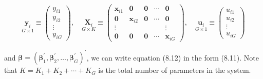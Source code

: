 \documentclass[10pt]{article}
\begin{document}
\[
\underset{G \times 1}{\mathbf{y}_{i}} \equiv\left(\begin{array}{c}
y_{i 1}  \tag{8.14}\\
y_{i 2} \\
\vdots \\
y_{i G}
\end{array}\right), \quad \underset{G \times K}{\mathbf{X}_{i}} \equiv\left(\begin{array}{ccccc}
\mathbf{x}_{i 1} & \mathbf{0} & \mathbf{0} & \cdots & \mathbf{0} \\
\mathbf{0} & \mathbf{x}_{i 2} & \mathbf{0} & \cdots & \mathbf{0} \\
\vdots & & & & \vdots \\
\mathbf{0} & \mathbf{0} & \mathbf{0} & \cdots & \mathbf{x}_{i G}
\end{array}\right), \quad \underset{G \times 1}{\mathbf{u}_{i}} \equiv\left(\begin{array}{c}
u_{i 1} \\
u_{i 2} \\
\vdots \\
u_{i G}
\end{array}\right)
\]

and $\boldsymbol{\beta}=\left(\boldsymbol{\beta}_{1}^{\prime}, \boldsymbol{\beta}_{2}^{\prime}, \ldots, \boldsymbol{\beta}_{G}^{\prime}\right)^{\prime}$, we can write equation (8.12) in the form (8.11). Note that $K=K_{1}+K_{2}+\cdots+K_{G}$ is the total number of parameters in the system.
\end{document}
